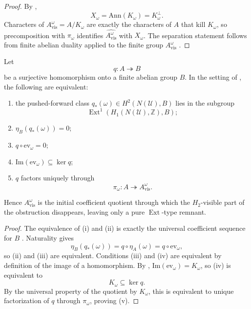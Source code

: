 \begin{proof}
By ,
\[
X_{\omega}=\mathrm{Ann}(K_{\omega})=K_{\omega}^{\perp}.
\]
Characters of $A_{\mathrm{vis}}^{\omega}=A/K_{\omega}$ are exactly the characters of $A$ that kill $K_{\omega}$, so precomposition with $\pi_{\omega}$ identifies $\widehat{A_{\mathrm{vis}}^{\omega}}$ with $X_{\omega}$. The separation statement follows from finite abelian duality applied to the finite group $A_{\mathrm{vis}}^{\omega}$ \cite[Part~I, Chap.~2]{Terras1999}.
\end{proof}

\begin{proposition}\label{thm:intrinsic-pure-ext-initiality}
Let
\[
q:A\twoheadrightarrow B
\]
be a surjective homomorphism onto a finite abelian group $B$. In the setting of , the following are equivalent:
\begin{enumerate}[label=(\roman*),nosep]
\item the pushed-forward class $q_*(\omega)\in H^2(N(\mathcal U),B)$ lies in the subgroup
\[
\operatorname{Ext}^1(H_1(N(\mathcal U),\mathbb Z),B);
\]
\item $\eta_B(q_*(\omega))=0$;
\item $q\circ \mathrm{ev}_{\omega}=0$;
\item $\mathrm{Im}(\mathrm{ev}_{\omega})\subseteq \ker q$;
\item $q$ factors uniquely through
\[
\pi_{\omega}:A\twoheadrightarrow A_{\mathrm{vis}}^{\omega}.
\]
\end{enumerate}
Hence $A_{\mathrm{vis}}^{\omega}$ is the initial coefficient quotient through which the $H_2$-visible part of the obstruction disappears, leaving only a pure $\operatorname{Ext}$-type remnant.
\end{proposition}

\begin{proof}
The equivalence of \textup{(i)} and \textup{(ii)} is exactly the universal coefficient sequence for $B$ \cite[Sec.~3.1]{Hatcher2002}. Naturality gives
\[
\eta_B(q_*(\omega))=q\circ \eta_A(\omega)=q\circ \mathrm{ev}_{\omega},
\]
so \textup{(ii)} and \textup{(iii)} are equivalent. Conditions \textup{(iii)} and \textup{(iv)} are equivalent by definition of the image of a homomorphism. By , $\mathrm{Im}(\mathrm{ev}_{\omega})=K_{\omega}$, so \textup{(iv)} is equivalent to
\[
K_{\omega}\subseteq \ker q.
\]
By the universal property of the quotient by $K_{\omega}$, this is equivalent to unique factorization of $q$ through $\pi_{\omega}$, proving \textup{(v)}.
\end{proof}

